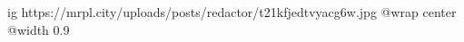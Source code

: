  
 
 
 
 

\ifcmt
  ig https://mrpl.city/uploads/posts/redactor/t21kfjedtvyacg6w.jpg
  @wrap center
  @width 0.9
\fi
